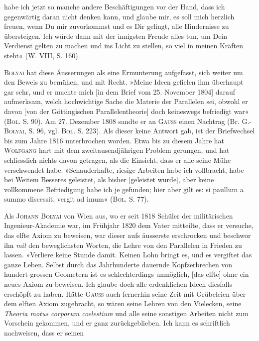 habe ich jetzt so manche andere Beschäftigungen vor der Hand, dass ich
gegenwärtig daran nicht denken kann, und glaube mir, es soll mich herzlich
freuen, wenn Du mir zuvorkommst und es Dir gelingt, alle Hindernisse zu
übersteigen. Ich würde dann mit der innigsten Freude alles tun, um Dein
Verdienst gelten zu machen und ins Licht zu stellen, so viel in meinen
Kräften steht« (W. VIII, S. 160).
\par
\textsc{Bolyai} hat diese Äusserungen als eine Ermunterung aufgefasst, sich weiter
um den Beweis zu bemühen, und mit Recht. »Meine Ideen gefielen ihm
überhaupt gar sehr, und er machte mich [in dem Brief vom 25. November
1804] darauf aufmerksam, welch hochwichtige Sache die Materie der Parallelen
sei, obwohl er davon [von der Göttingischen Parallelentheorie] doch keineswegs
befriedigt war« (\textsc{Bol.} S. 90). Am 27. Dezember 1808 sandte er an \textsc{Gauss}
einen Nachtrag (Br. G.-\textsc{Bolyai}, S. 96, vgl. \textsc{Bol.} S. 223). Als dieser keine
Antwort gab, ist der Briefwechsel bis zum Jahre 1816 unterbrochen worden.
Etwa bis zu diesem Jahre hat \textsc{Wolfgang} hart mit dem zweitausendjährigen
Problem gerungen, und hat schliesslich nichts davon getragen, als die Einsicht,
\clearpage{}
\noindent dass er alle seine Mühe verschwendet habe. »Schauderhafte, riesige
Arbeiten habe ich vollbracht, habe bei Weitem Besseres geleistet, als bisher
[geleistet wurde], aber keine vollkommene Befriedigung habe ich je gefunden;
hier aber gilt es: si paullum a summo discessit, vergit ad imum« (\textsc{Bol.} S. 77).
\par
Als \textsc{Johann Bolyai} von Wien aus, wo er seit 1818 Schüler der militärischen
Ingenieur-Akademie war, im Frühjahr 1820 dem Vater mitteilte, dass
er versuche, das elfte Axiom zu beweisen, war dieser aufs äusserste erschrocken
und beschwor ihn \textit{mit} den beweglichsten Worten, die Lehre von den Parallelen
in Frieden zu lassen. »Verliere keine Stunde damit. Keinen Lohn
bringt es, und es vergiftet das ganze Leben. Selbst durch das Jahrhunderte
dauernde Kopfzerbrechen von hundert grossen Geometern ist es schlechterdings
unmöglich, [das elfte] ohne ein neues Axiom zu beweisen. Ich glaube
doch alle erdenklichen Ideen diesfalls erschöpft zu haben. Hätte \textsc{Gauss} auch
fernerhin seine Zeit mit Grübeleien über dem elften Axiom zugebracht, so
wären seine Lehren von den Vielecken, seine \textit{Theoria motus corporum coelestium}
und alle seine sonstigen Arbeiten nicht zum Vorschein gekommen, und
er ganz zurückgeblieben. Ich kann es schriftlich nachweisen, dass er seinen

